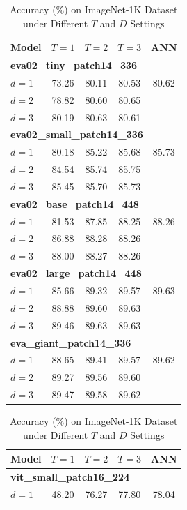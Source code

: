 \begin{table}[htbp]
\centering
\caption{Accuracy (\%) on ImageNet-1K Dataset under Different $T$ and $D$ Settings}
\label{tab:appendix_imagenet}
\begin{minipage}{0.48\textwidth}
\centering
\begin{tabular}{lcccc}
\toprule
\textbf{Model} & $T=1$ & $T=2$ & $T=3$ & \textbf{ANN} \\
\midrule
\multicolumn{5}{l}{\textbf{eva02\_tiny\_patch14\_336}} \\
$d=1$ & 73.26 & 80.11 & 80.53 & 80.62 \\
$d=2$ & 78.82 & 80.60 & 80.65 \\
$d=3$ & 80.19 & 80.63 & 80.61 \\
\midrule
\multicolumn{5}{l}{\textbf{eva02\_small\_patch14\_336}} \\
$d=1$ & 80.18 & 85.22 & 85.68 & 85.73 \\
$d=2$ & 84.54 & 85.74 & 85.75 \\
$d=3$ & 85.45 & 85.70 & 85.73 \\
\midrule
\multicolumn{5}{l}{\textbf{eva02\_base\_patch14\_448}} \\
$d=1$ & 81.53 & 87.85 & 88.25 & 88.26 \\
$d=2$ & 86.88 & 88.28 & 88.26 \\
$d=3$ & 88.00 & 88.27 & 88.26 \\
\midrule
\multicolumn{5}{l}{\textbf{eva02\_large\_patch14\_448}} \\
$d=1$ & 85.66 & 89.32 & 89.57 & 89.63 \\
$d=2$ & 88.88 & 89.60 & 89.63 \\
$d=3$ & 89.46 & 89.63 & 89.63 \\
\midrule
\multicolumn{5}{l}{\textbf{eva\_giant\_patch14\_336}} \\
$d=1$ & 88.65 & 89.41 & 89.57 & 89.62 \\
$d=2$ & 89.27 & 89.56 & 89.60 \\
$d=3$ & 89.47 & 89.58 & 89.62 \\
\bottomrule
\end{tabular}
\end{minipage}
\hfill
\begin{minipage}{0.48\textwidth}
\centering
\begin{tabular}{lcccc}
\toprule
\textbf{Model} & $T=1$ & $T=2$ & $T=3$ & \textbf{ANN} \\
\midrule
\multicolumn{5}{l}{\textbf{vit\_small\_patch16\_224}} \\
$d=1$ & 48.20 & 76.27 & 77.80 & 78.04 \\

\end{tabular}
\end{minipage}
\end{table}

